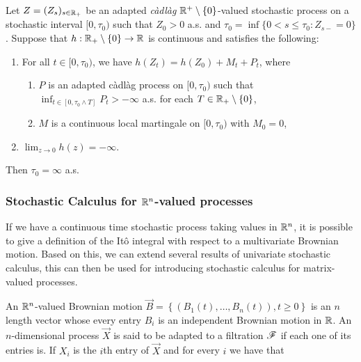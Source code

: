\begin{lemma} \label{lemma:mckean}
    Let $Z = (Z_s)_{s\in \mathbb R_+}$ be an adapted \textit{càdlàg} $\mathbb R^+\setminus \{0\}$-valued stochastic process on a stochastic interval $[0,\tau_0)$ such that $Z_0 > 0$ a.s. and $\tau_0 = \inf\{0 < s \le \tau_0 : Z_{s-} = 0\}$. Suppose that $h:\mathbb R_+\setminus\{0\}\to\mathbb R$ is continuous and satisfies the following:

    \begin{enumerate}

        \item For all $t\in[0,\tau_0)$, we have $h(Z_t) = h(Z_0) + M_t + P_t$, where 
        
        \begin{enumerate}
            \item  $P$ is an adapted càdlàg process on $[0,\tau_0)$ such that $\inf_{t\in[0,\tau_0\wedge T]} P_t > - \infty$ a.s. for each $T\in \mathbb R_+\setminus \{0\}$,
            
            \item  $M$ is a continuous local martingale on $[0,\tau_0)$ with $M_0=0$,
        \end{enumerate}
        
        \item $\lim_{z\to 0}h(z) = -\infty$.
    \end{enumerate}

    Then $\tau_0 = \infty$ a.s.
\end{lemma}



\subsubsection{Stochastic Calculus for $\mathbb R^n$-valued processes}

If we have a continuous time stochastic process taking values in $\mathbb R^n$, it is possible to give a definition of the Itô integral with respect to a multivariate Brownian motion. Based on this, we can extend several results of univariate stochastic calculus, this can then be used for introducing stochastic calculus for matrix-valued processes.

An $\mathbb R^n$-valued Brownian motion $\vec B = \left\{ (B_1(t), \dots, B_n(t)) , t \ge 0 \right\}$ is an $n$ length vector whose every entry $B_i$ is an independent Brownian motion in $\mathbb R$. An $n$-dimensional process $\vec X$ is said to be adapted to a filtration $\mathscr F$ if each one of its entries is. If $X_i$ is the $i$th entry of $\vec X$ and for every $i$ we have that

